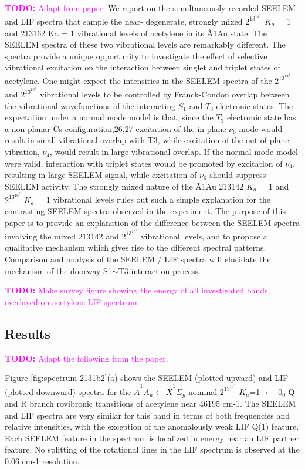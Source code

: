 \documentclass[12pt,draft]{mitthesis}
\newcommand{\TODO} [1]{\textcolor{magenta}{\textbf{TODO:} #1}}
\begin{document}
\TODO{Adapt from paper.}  We report on the simultaneously recorded
SEELEM and LIF spectra that sample the near- degenerate, strongly
mixed $2^13^14^2$ $K_a$ = 1 and 213162 Ka = 1 vibrational levels of
acetylene in its Ã1Au state. The SEELEM spectra of these two
vibrational levels are remarkably different. The spectra provide a
unique opportunity to investigate the effect of selective vibrational
excitation on the interaction between singlet and triplet states of
acetylene. One might expect the intensities in the SEELEM spectra of
the $2^13^14^2$ and $2^13^16^2$ vibrational levels to be controlled by
Franck-Condon overlap between the vibrational wavefunctions of the
interacting $S_1$ and $T_3$ electronic states. The expectation under a
normal mode model is that, since the $T_3$ electronic state has a
non-planar Cs configuration,26,27 excitation of the in-plane $\nu_6$ mode
would result in small vibrational overlap with T3, while excitation of
the out-of-plane vibration, $\nu_4$, would result in large vibrational
overlap. If the normal mode model were valid, interaction with triplet
states would be promoted by excitation of $\nu_4$, resulting in large
SEELEM signal, while excitation of $\nu_6$ should suppress SEELEM
activity. The strongly mixed nature of the Ã1Au 213142 $K_a$ = 1 and
$2^13^16^2$ $K_a$ = 1 vibrational levels rules out such a simple
explanation for the contrasting SEELEM spectra observed in the
experiment. The purpose of this paper is to provide an explanation of
the difference between the SEELEM spectra involving the mixed 213142
and $2^13^16^2$ vibrational levels, and to propose a qualitative
mechanism which gives rise to the different spectral
patterns. Comparison and analysis of the SEELEM / LIF spectra will
elucidate the mechanism of the doorway S1$\sim$T3 interaction process.


\TODO{Make survey figure showing the energy of all investigated bands,
  overlayed on acetylene LIF spectrum.}

\subsection{Results}

\TODO{Adapt the following from the paper.}

Figure \ref{fig:spectrum-2131b2}(a) shows the SEELEM (plotted upward)
and LIF (plotted downward) spectra for the $\tilde{A}^1A_u \leftarrow
\tilde{X}^1\Sigma_g$ nominal $2^13^14^2$ $K_a$=1 $\leftarrow$ $0_0$ Q
and R branch rovibronic transitions of acetylene near 46195 cm-1. The
SEELEM and LIF spectra are very similar for this band in terms of both
frequencies and relative intensities, with the exception of the
anomalously weak LIF Q(1) feature. Each SEELEM feature in the spectrum
is localized in energy near an LIF partner feature. No splitting of
the rotational lines in the LIF spectrum is observed at the 0.06 cm-1
resolution.
\end{document}
